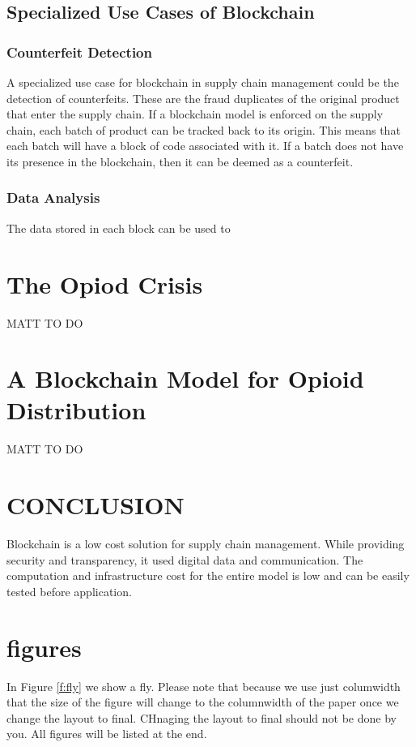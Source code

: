\documentclass[sigconf]{acmart}
\begin{document}
\subsection{Specialized Use Cases of Blockchain}
\subsubsection{Counterfeit Detection}
A specialized use case for blockchain in supply chain management could be the detection of counterfeits. These are the fraud duplicates of the original product that enter the supply chain. If a blockchain model is enforced on the supply chain, each batch of product can be tracked back to its origin. This means that each batch will have a block of code associated with it. If a batch does not have its presence in the blockchain, then it can be deemed as a counterfeit.  

\subsubsection{Data Analysis}
The data stored in each block can be used to 

\section{The Opiod Crisis}
MATT TO DO

\section{A Blockchain Model for Opioid Distribution}
MATT TO DO

\section{CONCLUSION}

Blockchain is a low cost solution for supply chain management. While providing security and transparency, it used digital data and communication. The computation and infrastructure cost for the entire model is low and can be easily tested before application.


\section{figures}

In Figure \ref{f:fly} we show a fly. Please note that because we use
just columwidth that the size of the figure will change to the
columnwidth of the paper once we change the layout to final. CHnaging
the layout to final should not be done by you. All figures will be
listed at the end.
\end{document}

